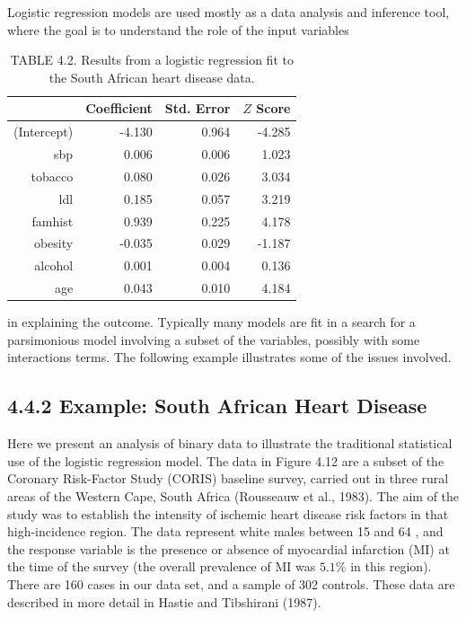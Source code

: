 \documentclass[10pt]{article}
\begin{document}
Logistic regression models are used mostly as a data analysis and inference tool, where the goal is to understand the role of the input variables

\begin{table}[h]
\begin{center}
\captionsetup{labelformat=empty}
\caption{TABLE 4.2. Results from a logistic regression fit to the South African heart disease data.}
\begin{tabular}{rrrr}
\hline
 & Coefficient & Std. Error & $Z$ Score \\
\hline
(Intercept) & -4.130 & 0.964 & -4.285 \\
sbp & 0.006 & 0.006 & 1.023 \\
tobacco & 0.080 & 0.026 & 3.034 \\
ldl & 0.185 & 0.057 & 3.219 \\
famhist & 0.939 & 0.225 & 4.178 \\
obesity & -0.035 & 0.029 & -1.187 \\
alcohol & 0.001 & 0.004 & 0.136 \\
age & 0.043 & 0.010 & 4.184 \\
\hline
\end{tabular}
\end{center}
\end{table}

in explaining the outcome. Typically many models are fit in a search for a parsimonious model involving a subset of the variables, possibly with some interactions terms. The following example illustrates some of the issues involved.

\subsection*{4.4.2 Example: South African Heart Disease}
Here we present an analysis of binary data to illustrate the traditional statistical use of the logistic regression model. The data in Figure 4.12 are a subset of the Coronary Risk-Factor Study (CORIS) baseline survey, carried out in three rural areas of the Western Cape, South Africa (Rousseauw et al., 1983). The aim of the study was to establish the intensity of ischemic heart disease risk factors in that high-incidence region. The data represent white males between 15 and 64 , and the response variable is the presence or absence of myocardial infarction (MI) at the time of the survey (the overall prevalence of MI was $5.1 \%$ in this region). There are 160 cases in our data set, and a sample of 302 controls. These data are described in more detail in Hastie and Tibshirani (1987).
\end{document}
